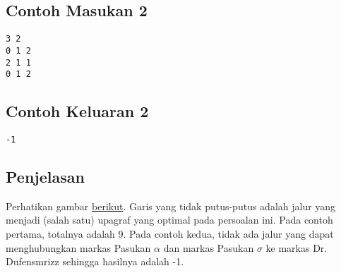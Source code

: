 \documentclass{article}
\begin{document}
\begin{multicols}{2}
\subsection*{Contoh Masukan 2}
\begin{lstlisting}
3 2
0 1 2
2 1 1
0 1 2
\end{lstlisting}
\columnbreak
\subsection*{Contoh Keluaran 2}
\begin{lstlisting}
-1
\end{lstlisting}
\vfill
\null
\end{multicols}


\subsection*{Penjelasan}

Perhatikan gambar \href{https://drive.google.com/file/d/125irwUk3SfLVxAFUN1jNmSnUMezxY975/view?usp=drive_link}{berikut}. Garis yang tidak putus-putus adalah jalur yang menjadi (salah satu) upagraf yang optimal pada persoalan ini. Pada contoh pertama, totalnya adalah 9. Pada contoh kedua, tidak ada jalur yang dapat menghubungkan markas Pasukan \(\alpha\) dan markas Pasukan \(\sigma\) ke markas Dr. Dufensmrizz sehingga hasilnya adalah -1.
\end{document}
